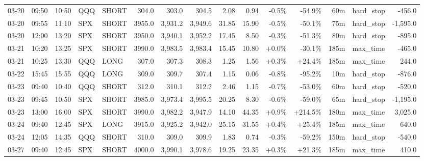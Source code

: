 \documentclass[11pt,a4paper,twoside]{article}
\begin{document}
\begin{landscape}
\begin{center}
\begin{longtable}{>{\color{txtmain}}l l l l l r r r r r r r r >{\color{txtmain}}l r}
03-20 & 09:50 & 10:50 & QQQ & SHORT & 304.0 & 303.0 & 304.5 & 2.08 & 0.94 & \textcolor{lossred}{-0.5\%} & \textcolor{lossred}{-54.9\%} & 60m & hard\_stop & \textcolor{lossred}{-456.0} \\
03-20 & 09:55 & 11:10 & SPX & SHORT & 3955.0 & 3,931.2 & 3,949.6 & 31.85 & 15.90 & \textcolor{lossred}{-0.5\%} & \textcolor{lossred}{-50.1\%} & 75m & hard\_stop & \textcolor{lossred}{-1,595.0} \\
03-20 & 12:00 & 13:20 & SPX & SHORT & 3950.0 & 3,940.1 & 3,952.2 & 17.45 & 8.50 & \textcolor{lossred}{-0.3\%} & \textcolor{lossred}{-51.3\%} & 80m & hard\_stop & \textcolor{lossred}{-895.0} \\
03-21 & 10:20 & 13:25 & SPX & SHORT & 3990.0 & 3,983.5 & 3,983.4 & 15.45 & 10.80 & \textcolor{wingreen}{+0.0\%} & \textcolor{lossred}{-30.1\%} & 185m & max\_time & \textcolor{lossred}{-465.0} \\
03-21 & 10:25 & 13:30 & QQQ & LONG & 307.0 & 307.3 & 308.3 & 1.25 & 1.56 & \textcolor{wingreen}{+0.3\%} & \textcolor{wingreen}{+24.4\%} & 185m & max\_time & \textcolor{wingreen}{244.0} \\
03-22 & 15:45 & 15:55 & QQQ & LONG & 309.0 & 309.7 & 307.4 & 1.15 & 0.06 & \textcolor{lossred}{-0.8\%} & \textcolor{lossred}{-95.2\%} & 10m & hard\_stop & \textcolor{lossred}{-876.0} \\
03-23 & 09:40 & 10:40 & QQQ & SHORT & 312.0 & 310.1 & 312.2 & 2.46 & 1.15 & \textcolor{lossred}{-0.7\%} & \textcolor{lossred}{-53.0\%} & 60m & hard\_stop & \textcolor{lossred}{-520.0} \\
03-23 & 09:45 & 10:50 & SPX & SHORT & 3985.0 & 3,973.4 & 3,995.5 & 20.25 & 8.30 & \textcolor{lossred}{-0.6\%} & \textcolor{lossred}{-59.0\%} & 65m & hard\_stop & \textcolor{lossred}{-1,195.0} \\
03-23 & 13:00 & 16:00 & SPX & SHORT & 3990.0 & 3,982.2 & 3,947.9 & 14.10 & 44.35 & \textcolor{wingreen}{+0.9\%} & \textcolor{wingreen}{+214.5\%} & 180m & max\_time & \textcolor{wingreen}{3,025.0} \\
03-24 & 09:40 & 12:45 & SPX & LONG & 3915.0 & 3,925.2 & 3,942.0 & 25.15 & 31.55 & \textcolor{wingreen}{+0.4\%} & \textcolor{wingreen}{+25.4\%} & 185m & max\_time & \textcolor{wingreen}{640.0} \\
03-24 & 12:05 & 14:35 & QQQ & SHORT & 310.0 & 309.0 & 309.9 & 1.83 & 0.74 & \textcolor{lossred}{-0.3\%} & \textcolor{lossred}{-59.2\%} & 150m & hard\_stop & \textcolor{lossred}{-540.0} \\
03-27 & 09:40 & 12:45 & SPX & SHORT & 4000.0 & 3,990.1 & 3,978.6 & 19.25 & 23.35 & \textcolor{wingreen}{+0.3\%} & \textcolor{wingreen}{+21.3\%} & 185m & max\_time & \textcolor{wingreen}{410.0} \\

\end{longtable}
\end{center}
\end{landscape}
\end{document}
